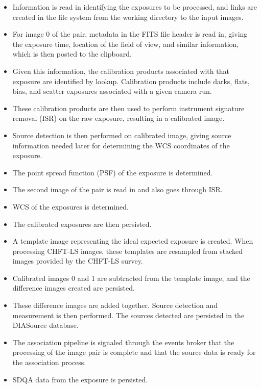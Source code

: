 \begin{itemize}

\item Information is read in identifying the exposures to be processed, and 
links are created in the file system from the working directory to the input
images.

\item For image 0 of the pair, metadata in the FITS file header is read in, 
giving the exposure time, location of the field of view, and similar information, 
which is then posted to the clipboard.

\item Given this information, the calibration products associated with that
exposure are identified by lookup. Calibration products include darks,
flats, bias, and scatter exposures associated with a given camera run.

\item These calibration products are then used to perform instrument
signature removal (ISR) on the raw exposure, resulting in a calibrated image.

\item Source detection is then performed on calibrated image, giving source
information needed later for determining the WCS coordinates of the
exposure.

\item The point spread function (PSF) of the exposure is determined.

\item The second image of the pair is read in and also goes through ISR.

\item WCS of the exposures is determined.

\item The calibrated exposures are then persisted.

\item A template image representing the ideal expected exposure is
created. When processing CHFT-LS images, these templates are 
resampled from stacked images provided by the CHFT-LS survey.

\item Calibrated images 0 and 1 are subtracted from the template
image, and the difference images created are persisted.

\item These difference images are added together. Source detection
and measurement is then performed. The sources detected are
persisted in the DIASource database.

\item The association pipeline is signaled through the events broker
that the processing of the image pair is complete and that the source
data is ready for the association process.

\item SDQA data from the exposure is persisted.

\end{itemize}

